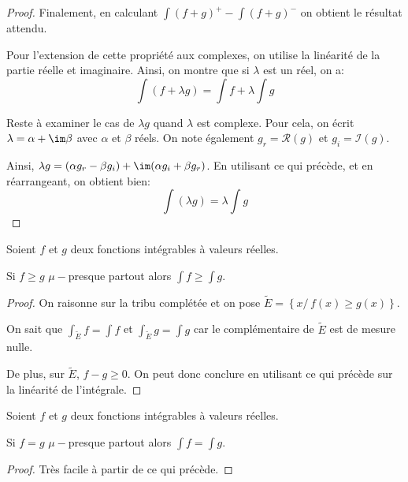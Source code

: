 \begin{proof}
Finalement, en calculant $\displaystyle{\int} (f+g)^{+}-\displaystyle{\int} (f+g)^{-}$ on obtient le résultat attendu.

Pour l'extension de cette propriété aux complexes, on utilise la linéarité de la partie réelle et imaginaire. Ainsi, on montre que si $\lambda$ est un réel, on a:
\[
\displaystyle{\int} \left(f+\lambda g\right) = \displaystyle{\int} f + \lambda \displaystyle{\int} g
\]

Reste à examiner le cas de $\lambda g$ quand $\lambda$ est complexe. Pour cela, on écrit $\lambda = \alpha + \im \beta$  avec $\alpha$ et $\beta$ réels. On note également $g_r = \mathcal{R}(g)$ et $g_i = \mathcal{I}(g)$.

Ainsi, $\lambda g = \left(\alpha g_r - \beta g_i\right) + \im (\alpha g_i + \beta g_r)$. En utilisant ce qui précède, et en réarrangeant, on obtient bien:
\[
\displaystyle{\int} \left(\lambda g\right) = \lambda \displaystyle{\int} g
\]
\end{proof}



\begin{prop}
Soient $f$ et $g$ deux fonctions intégrables à valeurs réelles.

Si $f \geq g$ $\mu-$presque partout alors $\displaystyle{\int} f \geq \displaystyle{\int} g$.
\end{prop}

\begin{proof}
On raisonne sur la tribu complétée et on pose $\tilde{E} = \left \{ x/ \, f(x) \geq g(x) \right \}$.

On sait que $\displaystyle{\int}_{\tilde{E}} f = \displaystyle{\int} f$ et $\displaystyle{\int}_{\tilde{E}} g = \displaystyle{\int} g$ car le complémentaire de $\tilde{E}$ est de mesure nulle.

De plus, sur $\tilde{E}$, $f-g \geq 0$. On peut donc conclure en utilisant ce qui précède sur la linéarité de l'intégrale.
\end{proof}

\begin{prop}
Soient $f$ et $g$ deux fonctions intégrables à valeurs réelles.

Si $f = g$ $\mu-$presque partout alors $\displaystyle{\int} f = \displaystyle{\int} g$.
\end{prop}

\begin{proof}
Très facile à partir de ce qui précède.
\end{proof}

